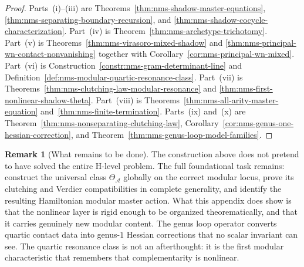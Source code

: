 \documentclass[11pt,oneside]{memoir}
\numberwithin{equation}{chapter}
\theoremstyle{definition}
\newtheorem{remark}[theorem]{Remark}
\newcommand{\cA}{\mathcal A}
\begin{document}
\begin{proof}
Parts~(i)--(iii) are Theorems~\ref{thm:nms-shadow-master-equations}, \ref{thm:nms-separating-boundary-recursion}, and \ref{thm:nms-shadow-cocycle-characterization}.  Part~(iv) is Theorem~\ref{thm:nms-archetype-trichotomy}.  Part~(v) is Theorems~\ref{thm:nms-virasoro-mixed-shadow} and \ref{thm:nms-principal-wn-contact-nonvanishing} together with Corollary~\ref{cor:nms-principal-wn-mixed}.  Part~(vi) is Construction~\ref{constr:nms-gram-determinant-line} and Definition~\ref{def:nms-modular-quartic-resonance-class}.  Part~(vii) is Theorems~\ref{thm:nms-clutching-law-modular-resonance} and \ref{thm:nms-first-nonlinear-shadow-theta}.  Part~(viii) is Theorems~\ref{thm:nms-all-arity-master-equation} and~\ref{thm:nms-finite-termination}.  Parts~(ix) and~(x) are Theorem~\ref{thm:nms-nonseparating-clutching-law}, Corollary~\ref{cor:nms-genus-one-hessian-correction}, and Theorem~\ref{thm:nms-genus-loop-model-families}.\qedhere
\end{proof}

\begin{remark}[What remains to be done]
\label{rem:nms-what-remains}
The construction above does not pretend to have solved the entire H-level problem.  The full foundational task remains: construct the universal class $\Theta_{\cA}$ globally on the correct modular locus, prove its clutching and Verdier compatibilities in complete generality, and identify the resulting Hamiltonian modular master action.  What this appendix does show is that the nonlinear layer is rigid enough to be organized theorematically, and that it carries genuinely new modular content.  The genus loop operator converts quartic contact data into genus-$1$ Hessian corrections that no scalar invariant can see.  The quartic resonance class is not an afterthought: it is the first modular characteristic that remembers that complementarity is nonlinear.
\end{remark}


\backmatter
\end{document}
